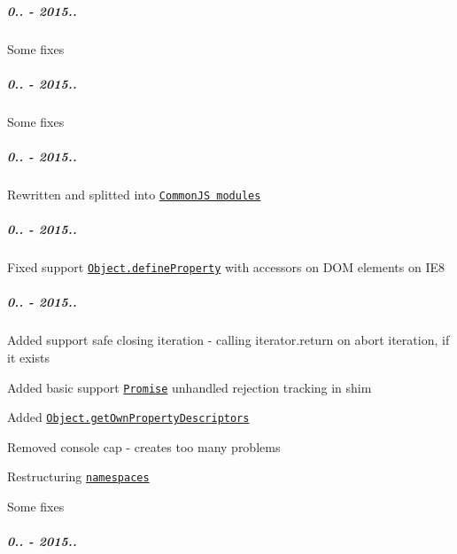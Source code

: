\subparagraph*{0.. -\/ 2015..}


\begin{DoxyItemize}
\item Some fixes
\end{DoxyItemize}

\subparagraph*{0.. -\/ 2015..}


\begin{DoxyItemize}
\item Some fixes
\end{DoxyItemize}

\subparagraph*{0.. -\/ 2015..}


\begin{DoxyItemize}
\item Rewritten and splitted into \href{https://github.com/zloirock/core-js/#commonjs}{\tt Common\+JS modules}
\end{DoxyItemize}

\subparagraph*{0.. -\/ 2015..}


\begin{DoxyItemize}
\item Fixed support \href{https://github.com/zloirock/core-js/#ecmascript-5}{\tt {\ttfamily Object.\+define\+Property}} with accessors on D\+OM elements on I\+E8
\end{DoxyItemize}

\subparagraph*{0.. -\/ 2015..}


\begin{DoxyItemize}
\item Added support safe closing iteration -\/ calling {\ttfamily iterator.\+return} on abort iteration, if it exists
\item Added basic support \href{https://github.com/zloirock/core-js/#ecmascript-6-promise}{\tt {\ttfamily Promise}} unhandled rejection tracking in shim
\item Added \href{https://github.com/zloirock/core-js/#ecmascript-7-proposals}{\tt {\ttfamily Object.\+get\+Own\+Property\+Descriptors}}
\item Removed {\ttfamily console} cap -\/ creates too many problems
\item Restructuring \href{https://github.com/zloirock/core-js/#custom-build}{\tt namespaces}
\item Some fixes
\end{DoxyItemize}

\subparagraph*{0.. -\/ 2015..}


